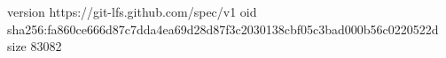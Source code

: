 version https://git-lfs.github.com/spec/v1
oid sha256:fa860ce666d87c7dda4ea69d28d87f3c2030138cbf05c3bad000b56c0220522d
size 83082

